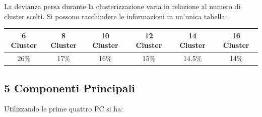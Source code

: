 La devianza persa durante la clusterizzazione varia in relazione al numero di cluster scelti. Si possono racchiudere le informazioni in un'unica tabella:
\begin{center}
	\begin{tabular}{|c|c|c|c|c|c|}
		\hline
		\textbf{6 Cluster} & \textbf{8 Cluster} & \textbf{10 Cluster} &\textbf{12 Cluster}& \textbf{14 Cluster} & \textbf{16 Cluster} \\
		\hline
		26\%& 17\% & 16\% & 15\% & 14.5\% & 14\% \\
		\hline
	\end{tabular}
\end{center}
\vspace{0.5cm}
 \subsection{5 Componenti Principali}
 Utilizzando le prime quattro PC si ha:
